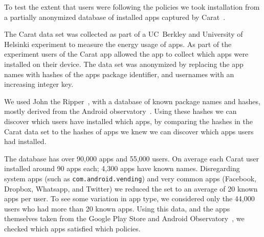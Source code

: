 \documentclass[thesis.tex]{subfiles}
\begin{document}
To test the extent that users were following the policies we took
installation from a partially anonymized database of installed apps
captured by Carat~\cite{oliner_carat:_2013}.

The Carat data set was collected as part of a UC~Berkley and University
of Helsinki experiment to measure the energy usage of apps.  As part
of the experiment users of the Carat app allowed the app to collect
which apps were installed on their device.  The data set was anonymized
by replacing the app names with hashes of the apps package identifier,
and usernames with an increasing integer key.

We used John the Ripper~\cite{solar_designer_john_2013}, with a
database of known package names and hashes, mostly derived from the
Android observatory~\cite{barrera_understanding_2012}.  Using these
hashes we can discover which users have installed which apps, by
comparing the hashes in the Carat data set to the hashes of apps we
knew we can discover which apps users had installed.

The database has over 90,000 apps and 55,000 users.  On average each
Carat user installed around 90 apps each; 4,300 apps have known names.
Disregarding system apps (such as \texttt{com.android.vending}) and
very common apps (Facebook, Dropbox, Whatsapp, and Twitter) we reduced
the set to an average of 20 known apps per user.  To see some
variation in app type, we considered only the 44,000 users who had
more than 20 known apps.  Using this data, and the apps themselves
taken from the Google Play Store and Android
Observatory~\cite{barrera_understanding_2012}, we checked which apps
satisfied which policies.
\end{document}

